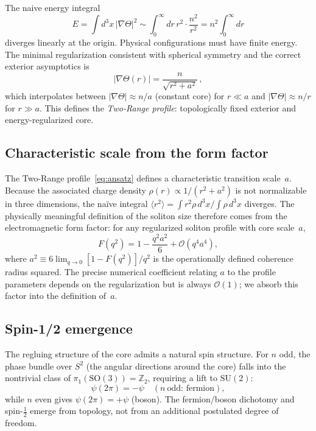 ﻿\documentclass[a4paper,12pt]{article}
\newcommand{\vev}[1]{\langle #1 \rangle}
\newcommand{\order}[1]{\mathcal{O}(#1)}
\begin{document}
The naive energy integral
\begin{equation}
  E = \int d^3x\,|\nabla\Theta|^2
    \sim \int_0^\infty dr\,r^2\cdot\frac{n^2}{r^2}
    = n^2\int_0^\infty dr
\end{equation}
diverges linearly at the origin.  Physical configurations must have
finite energy.  The minimal regularization consistent with spherical
symmetry and the correct exterior asymptotics is
\begin{equation}
  |\nabla\Theta(r)| = \frac{n}{\sqrt{r^2+a^2}}\,,
  \label{eq:ansatz}
\end{equation}
which interpolates between $|\nabla\Theta|\approx n/a$ (constant core)
for $r\ll a$ and $|\nabla\Theta|\approx n/r$ for $r\gg a$.  This
defines the \emph{Two-Range profile}: topologically fixed exterior and
energy-regularized core.

\subsection{Characteristic scale from the form factor}

The Two-Range profile~\eqref{eq:ansatz} defines a characteristic
transition scale~$a$.  Because the associated charge density
$\rho(r)\propto 1/(r^2+a^2)$ is not normalizable in three dimensions,
the na\"ive integral $\vev{r^2}=\int r^2\rho\,d^3x/\int\rho\,d^3x$
diverges.  The physically meaningful definition of the soliton size
therefore comes from the electromagnetic form factor: for any
regularized soliton profile with core scale~$a$,
\begin{equation}
  F(q^2) = 1 - \frac{q^2 a^2}{6} + \order{q^4 a^4},
  \label{eq:r2}
\end{equation}
where $a^2\equiv 6\lim_{q\to 0}[1-F(q^2)]/q^2$ is the operationally
defined coherence radius squared.  The precise numerical coefficient
relating $a$ to the profile parameters depends on the regularization
but is always $\order{1}$; we absorb this factor into the definition
of~$a$.

\subsection{Spin-1/2 emergence}

The regluing structure of the core admits a natural spin structure.
For $n$ odd, the phase bundle over $S^2$ (the angular directions
around the core) falls into the nontrivial class of
$\pi_1(\mathrm{SO}(3))=\mathbb{Z}_2$, requiring a lift to
$\mathrm{SU}(2)$:
\begin{equation}
  \psi(2\pi) = -\psi \quad (n~\text{odd: fermion}),
  \label{eq:spin}
\end{equation}
while $n$ even gives $\psi(2\pi)=+\psi$ (boson).  The fermion/boson
dichotomy and spin-$\tfrac{1}{2}$ emerge from topology, not from an
additional postulated degree of freedom.
\end{document}
